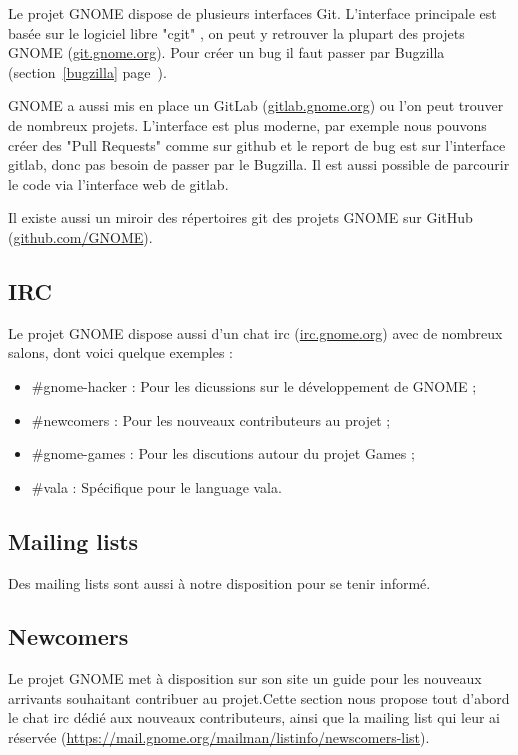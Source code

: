 \documentclass[12pt]{report}
\begin{document}
\label{cgit}
Le projet GNOME dispose de plusieurs interfaces Git. L'interface 
principale est basée sur le logiciel libre "cgit"
, on peut y retrouver la plupart des projets GNOME 
(\href{https://git.gnome.org/}{git.gnome.org}). Pour créer un bug il faut
passer par Bugzilla (section~\ref{bugzilla} page~\pageref{bugzilla}).

\label{gitlab}
GNOME a aussi mis en place un GitLab (\href{https://gitlab.gnome.org/GNOME}
{gitlab.gnome.org}) ou l'on peut trouver de nombreux projets. L'interface
est plus moderne, par exemple nous pouvons créer des "Pull Requests" comme
sur github et le report de bug est sur l'interface gitlab, donc pas besoin
de passer par le Bugzilla. Il est aussi possible de parcourir le code via
l'interface web de gitlab.

\label{github}
Il existe aussi un miroir des répertoires git des projets GNOME sur GitHub 
(\href{https://github.com/GNOME}{github.com/GNOME}).

\subsection{IRC}
Le projet GNOME dispose aussi d'un chat irc (\url{irc.gnome.org})
avec de nombreux salons, dont voici quelque exemples :
\begin{itemize}
\item \#gnome-hacker : Pour les dicussions sur le développement de GNOME ;
\item \#newcomers : Pour les nouveaux contributeurs au projet ;
\item \#gnome-games : Pour les discutions autour du projet Games ;
\item \#vala : Spécifique pour le language vala.
\end{itemize}

\subsection{Mailing lists}
Des mailing lists sont aussi à notre disposition pour se tenir informé.

\subsection{Newcomers}
Le projet GNOME met à disposition sur son site un guide pour les nouveaux
arrivants souhaitant contribuer au projet.Cette section nous propose
tout d'abord le chat irc dédié aux nouveaux contributeurs, ainsi que la
mailing list qui leur ai réservée
(\url{https://mail.gnome.org/mailman/listinfo/newscomers-list}).
\end{document}
